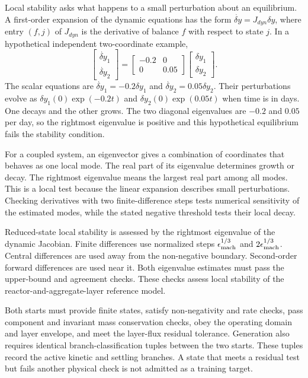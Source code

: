 Local stability asks what happens to a small perturbation about an equilibrium. A first-order expansion of the dynamic equations has the form $\dot{\delta y}=J_{dyn}\delta y$, where entry $(f,j)$ of $J_{dyn}$ is the derivative of balance $f$ with respect to state $j$. In a hypothetical independent two-coordinate example,
\[
\begin{bmatrix}\dot{\delta y}_1\\\dot{\delta y}_2\end{bmatrix}
=\begin{bmatrix}-0.2&0\\0&0.05\end{bmatrix}
\begin{bmatrix}\delta y_1\\\delta y_2\end{bmatrix}.
\]
The scalar equations are $\dot{\delta y}_1=-0.2\delta y_1$ and $\dot{\delta y}_2=0.05\delta y_2$. Their perturbations evolve as $\delta y_1(0)\exp(-0.2t)$ and $\delta y_2(0)\exp(0.05t)$ when time is in days. One decays and the other grows. The two diagonal eigenvalues are $-0.2$ and $0.05$ per day, so the rightmost eigenvalue is positive and this hypothetical equilibrium fails the stability condition.

For a coupled system, an eigenvector gives a combination of coordinates that behaves as one local mode. The real part of its eigenvalue determines growth or decay. The rightmost eigenvalue means the largest real part among all modes. This is a local test because the linear expansion describes small perturbations. Checking derivatives with two finite-difference steps tests numerical sensitivity of the estimated modes, while the stated negative threshold tests their local decay.

Reduced-state local stability is assessed by the rightmost eigenvalue of the dynamic Jacobian. Finite differences use normalized steps $\epsilon_{\rm mach}^{1/3}$ and $2\epsilon_{\rm mach}^{1/3}$. Central differences are used away from the non-negative boundary. Second-order forward differences are used near it. Both eigenvalue estimates must pass the upper-bound and agreement checks. These checks assess local stability of the reactor-and-aggregate-layer reference model.

Both starts must provide finite states, satisfy non-negativity and rate checks, pass component and invariant mass conservation checks, obey the operating domain and layer envelope, and meet the layer-flux residual tolerance. Generation also requires identical branch-classification tuples between the two starts. These tuples record the active kinetic and settling branches. A state that meets a residual test but fails another physical check is not admitted as a training target.

